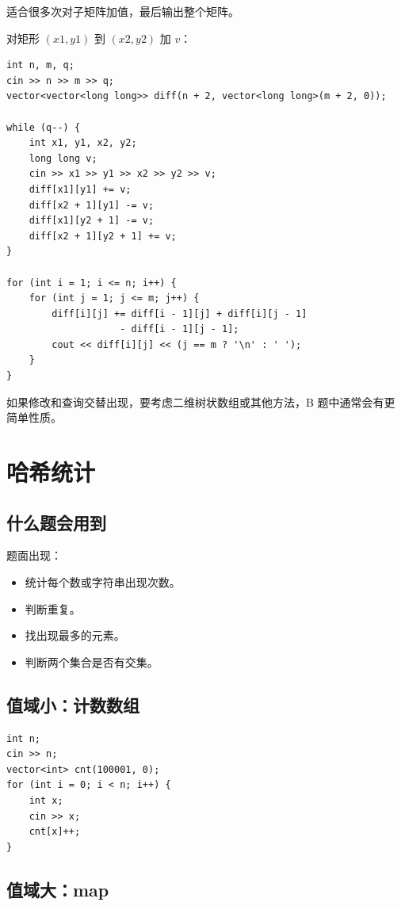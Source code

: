 适合很多次对子矩阵加值，最后输出整个矩阵。

对矩形 $(x1,y1)$ 到 $(x2,y2)$ 加 $v$：

\begin{lstlisting}
int n, m, q;
cin >> n >> m >> q;
vector<vector<long long>> diff(n + 2, vector<long long>(m + 2, 0));

while (q--) {
    int x1, y1, x2, y2;
    long long v;
    cin >> x1 >> y1 >> x2 >> y2 >> v;
    diff[x1][y1] += v;
    diff[x2 + 1][y1] -= v;
    diff[x1][y2 + 1] -= v;
    diff[x2 + 1][y2 + 1] += v;
}

for (int i = 1; i <= n; i++) {
    for (int j = 1; j <= m; j++) {
        diff[i][j] += diff[i - 1][j] + diff[i][j - 1]
                    - diff[i - 1][j - 1];
        cout << diff[i][j] << (j == m ? '\n' : ' ');
    }
}
\end{lstlisting}

如果修改和查询交替出现，要考虑二维树状数组或其他方法，B 题中通常会有更简单性质。

\section{哈希统计}\label{sec:06-10}

\subsection{什么题会用到}

题面出现：

\begin{itemize}
  \item 统计每个数或字符串出现次数。
  \item 判断重复。
  \item 找出现最多的元素。
  \item 判断两个集合是否有交集。
\end{itemize}

\subsection{值域小：计数数组}

\begin{lstlisting}
int n;
cin >> n;
vector<int> cnt(100001, 0);
for (int i = 0; i < n; i++) {
    int x;
    cin >> x;
    cnt[x]++;
}
\end{lstlisting}

\subsection{值域大：map}

